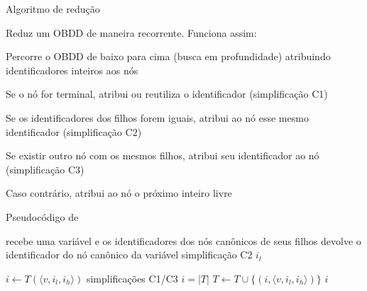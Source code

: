 \expandafter\documentclass\expandafter[table, usenames, svgnames, dvipsnames,14pt, \classopts]{beamer}
\begin{document}
\begin{frame}{Algoritmo de redução}

    \small
    Reduz um OBDD de maneira recorrente. Funciona assim:
    
    \begin{outline}[enumerate]
        \1 Percorre o OBDD de baixo para cima (busca em profundidade) atribuindo identificadores inteiros aos nós
        
        \1 Se o nó for terminal, atribui ou reutiliza o identificador (simplificação C1)
        
        \1 Se os identificadores dos filhos forem iguais, atribui ao nó esse mesmo identificador (simplificação C2)
        
        \1 Se existir outro nó com os mesmos filhos, atribui seu identificador ao nó (simplificação C3)
        
        \1 Caso contrário, atribui ao nó o próximo inteiro livre
        
    \end{outline}

\end{frame}

\begin{frame}{Pseudocódigo de }
    \begin{algorithm}[H]
        \scriptsize
        \begin{algorithmic}[1]
            \Require recebe uma variável e os identificadores dos nós canônicos de seus filhos
            \Ensure devolve o identificador do nó canônico da variável
                     \Comment simplificação C2
                        \State \Return $i_l$
                    \EndIf
                \EndIf
            
                \State $i \gets T(\langle v,i_l,i_h \rangle)$
                 \Comment simplificações C1/C3
                    \State $i = |T|$
                    \State $T \gets T \cup \{(i, \langle v,i_l,i_h \rangle)\}$
                \EndIf
                \State \Return $i$
            \EndFunction
        \end{algorithmic}
    \end{algorithm}

\end{frame}
\end{document}
